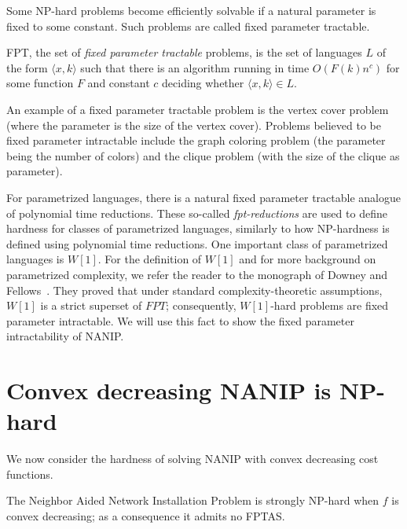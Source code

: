 Some NP-hard problems become efficiently solvable if a natural parameter is
fixed to some constant. Such problems are called fixed parameter tractable.

\begin{definition}
FPT, the set of \emph{fixed parameter tractable} problems, is the set
of languages $L$ of the form $\langle x,k\rangle$
such that there is an algorithm running in time $O(F(k) n^c)$ for some function
$F$ and constant $c$ deciding whether $\langle x,k\rangle\in L$.
\end{definition}

An example of a fixed parameter tractable problem is the vertex cover problem
(where the parameter is the size of the vertex cover). 
Problems believed to be fixed parameter intractable include the graph coloring problem
(the parameter being the number of colors) and the clique problem (with the size of 
the clique as parameter).

For parametrized languages, there is a natural fixed parameter tractable analogue of polynomial time reductions.
These so-called \emph{fpt-reductions} are used to define hardness for classes of parametrized languages,
similarly to how NP-hardness is defined using polynomial time reductions.
One important class of parametrized languages is $W[1]$. For the definition of $W[1]$ and for more background
on parametrized complexity, we refer the reader to the monograph of Downey and Fellows~\cite{DowneyF13}.
They proved that under standard complexity-theoretic assumptions, $W[1]$ is a strict superset of
$FPT$; consequently, $W[1]$-hard problems are fixed parameter intractable.
We will use this fact to show the fixed parameter intractability of NANIP.


\section{Convex decreasing NANIP is NP-hard} \label{sec:computation} We now
consider the hardness of solving NANIP with convex decreasing cost functions.

\begin{theorem} \label{thm:np-hard} The Neighbor Aided Network Installation
Problem is strongly NP-hard when $f$ is convex decreasing; as a consequence it
admits no FPTAS. \end{theorem}

